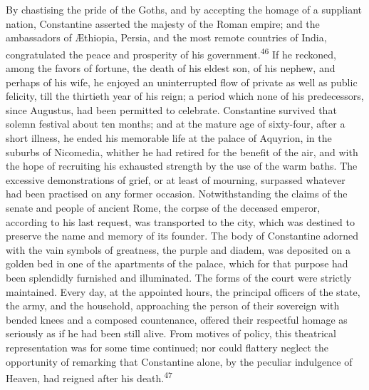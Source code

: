 

By chastising the pride of the Goths, and by accepting the homage
of a suppliant nation, Constantine asserted the majesty of the
Roman empire; and the ambassadors of Æthiopia, Persia, and the
most remote countries of India, congratulated the peace and
prosperity of his government.\textsuperscript{46} If he reckoned, among the favors
of fortune, the death of his eldest son, of his nephew, and
perhaps of his wife, he enjoyed an uninterrupted flow of private
as well as public felicity, till the thirtieth year of his reign;
a period which none of his predecessors, since Augustus, had been
permitted to celebrate. Constantine survived that solemn festival
about ten months; and at the mature age of sixty-four, after a
short illness, he ended his memorable life at the palace of
Aquyrion, in the suburbs of Nicomedia, whither he had retired for
the benefit of the air, and with the hope of recruiting his
exhausted strength by the use of the warm baths. The excessive
demonstrations of grief, or at least of mourning, surpassed
whatever had been practised on any former occasion.
Notwithstanding the claims of the senate and people of ancient
Rome, the corpse of the deceased emperor, according to his last
request, was transported to the city, which was destined to
preserve the name and memory of its founder. The body of
Constantine adorned with the vain symbols of greatness, the
purple and diadem, was deposited on a golden bed in one of the
apartments of the palace, which for that purpose had been
splendidly furnished and illuminated. The forms of the court were
strictly maintained. Every day, at the appointed hours, the
principal officers of the state, the army, and the household,
approaching the person of their sovereign with bended knees and a
composed countenance, offered their respectful homage as
seriously as if he had been still alive. From motives of policy,
this theatrical representation was for some time continued; nor
could flattery neglect the opportunity of remarking that
Constantine alone, by the peculiar indulgence of Heaven, had
reigned after his death.\textsuperscript{47}

